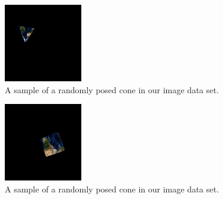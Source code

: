 \documentclass[journal]{IEEEtran}
\begin{document}
\begin{figure}[H]
	\hspace{-10 ex}

	\centering
	\includegraphics[width=.6\linewidth]{cone_450}

	\caption{A sample of a randomly posed cone in our image data set.}
	\label{openglCone}
\end{figure}

\begin{figure}[H]
	\hspace{-10 ex}

	\centering
	\includegraphics[width=.6\linewidth]{cube_301}

	\caption{A sample of a randomly posed cone in our image data set.}
	\label{openglCube}
\end{figure}
\end{document}
